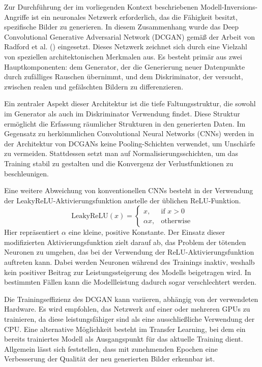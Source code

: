 Zur Durchführung der im vorliegenden Kontext beschriebenen Modell-Inversions-Angriffe ist ein neuronales Netzwerk erforderlich, das die Fähigkeit besitzt, spezifische Bilder zu generieren. In diesem Zusammenhang wurde das Deep Convolutional Generative Adversarial Network (DCGAN) gemäß der Arbeit von Radford et al. (\cite{radford_unsupervised_2016}) eingesetzt. Dieses Netzwerk zeichnet sich durch eine Vielzahl von speziellen architektonischen Merkmalen aus. Es besteht primär aus zwei Hauptkomponenten: dem Generator, der die Generierung neuer Datenpunkte durch zufälliges Rauschen übernimmt, und dem Diskriminator, der versucht, zwischen realen und gefälschten Bildern zu differenzieren.

Ein zentraler Aspekt dieser Architektur ist die tiefe Faltungsstruktur, die sowohl im Generator als auch im Diskriminator Verwendung findet. Diese Struktur ermöglicht die Erfassung räumlicher Strukturen in den generierten Daten. Im Gegensatz zu herkömmlichen Convolutional Neural Networks (CNNs) werden in der Architektur von DCGANs keine Pooling-Schichten verwendet, um Unschärfe zu vermeiden. Stattdessen setzt man auf Normalisierungsschichten, um das Training stabil zu gestalten und die Konvergenz der Verlustfunktionen zu beschleunigen.

Eine weitere Abweichung von konventionellen CNNs besteht in der Verwendung der LeakyReLU-Aktivierungsfunktion anstelle der üblichen ReLU-Funktion.
\[
\text{LeakyReLU}(x) = \begin{cases}
	x, & \text{if } x > 0 \\
	\alpha x, & \text{otherwise}
\end{cases}
\]
Hier repräsentiert $\alpha$ eine kleine, positive Konstante. Der Einsatz dieser modifizierten Aktivierungsfunktion zielt darauf ab, das Problem der \glqq tötenden Neuronen\grqq{} zu umgehen, das bei der Verwendung der ReLU-Aktivierungsfunktion auftreten kann. Dabei werden Neuronen während des Trainings inaktiv, weshalb kein positiver Beitrag zur Leistungssteigerung des Modells beigetragen wird. In bestimmten Fällen kann die Modellleistung dadurch sogar verschlechtert werden. 

Die Trainingseffizienz des DCGAN kann variieren, abhängig von der verwendeten Hardware. Es wird empfohlen, das Netzwerk auf einer oder mehreren GPUs zu trainieren, da diese leistungsfähiger sind als eine ausschließliche Verwendung der CPU. Eine alternative Möglichkeit besteht im Transfer Learning, bei dem ein bereits trainiertes Modell als Ausgangspunkt für das aktuelle Training dient. Allgemein lässt sich feststellen, dass mit zunehmenden Epochen eine Verbesserung der Qualität der neu generierten Bilder erkennbar ist.

